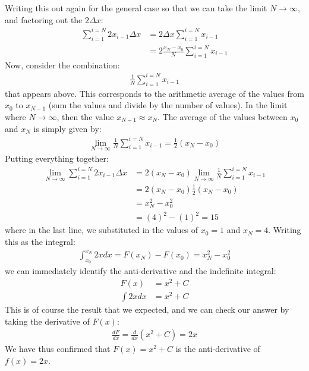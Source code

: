 Writing this out again for the general case so that we can take the limit $N\to\infty$, and factoring out the $2\Delta x$:
\begin{align*}
\sum_{i=1}^{i=N} 2x_{i-1} \Delta x &=2 \Delta x\sum_{i=1}^{i=N}x_{i-1}\\
&=2 \frac{x_N-x_0}{N}\sum_{i=1}^{i=N}x_{i-1}
\end{align*}
Now, consider the combination:
\begin{align*}
\frac{1}{N}\sum_{i=1}^{i=N}x_{i-1}
\end{align*}
that appears above. This corresponds to the arithmetic average of the values from $x_0$ to $x_{N-1}$ (sum the values and divide by the number of values). In the limit where $N\to \infty$, then the value $x_{N-1}\approx x_N$. The average of the values between $x_0$ and $x_N$ is simply given by:
\begin{align*}
\lim_{N\to\infty}\frac{1}{N}\sum_{i=1}^{i=N}x_{i-1}=\frac{1}{2}(x_N-x_0)
\end{align*}
Putting everything together:
\begin{align*}
\lim_{N\to\infty}\sum_{i=1}^{i=N} 2x_{i-1} \Delta x &=2 (x_N-x_0)\lim_{N\to\infty}\frac{1}{N}\sum_{i=1}^{i=N}x_{i-1}\\
&=2 (x_N-x_0)\frac{1}{2}(x_N-x_0)\\
&=x_N^2 - x_0^2\\
&=(4)^2 - (1)^2 = 15
\end{align*}
where in the last line, we substituted in the values of $x_0=1$ and $x_N=4$. Writing this as the integral:
\begin{align*}
\int_{x_0}^{x_N}2x dx=F(x_N) - F(x_0)=x_N^2 - x_0^2
\end{align*}
we can immediately identify the anti-derivative and the indefinite integral:
\begin{align*}
F(x) &= x^2 +C \\
\int 2xdx&=x^2 +C
\end{align*}
This is of course the result that we expected, and we can check our answer by taking the derivative of $F(x)$:
\begin{align*}
\frac{dF}{dx}=\frac{d}{dx}(x^2+C) = 2x
\end{align*}
We have thus confirmed that $F(x)=x^2+C$ is the anti-derivative of $f(x)=2x$.



